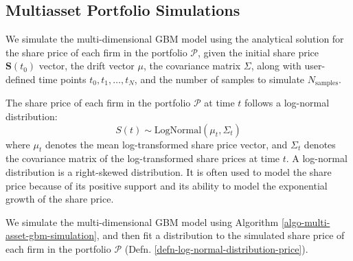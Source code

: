 \documentclass[11pt]{article}
\theoremstyle{definition}
\begin{document}
\subsection{Multiasset Portfolio Simulations}
We simulate the multi-dimensional GBM model using the analytical solution for the share price of each firm in the portfolio $\mathcal{P}$, given the initial share price $\mathbf{S}(t_{0})$ vector, the drift vector $\mu$, the covariance matrix $\Sigma$, along with user-defined time points $t_{0},t_{1},\dots,t_{N}$, and the number of samples to simulate $N_{\text{samples}}$. 

\begin{definition}\label{defn-log-normal-distribution-price}
The share price of each firm in the portfolio $\mathcal{P}$ at time $t$ follows a log-normal distribution:
\begin{equation*}
S(t)\sim\text{LogNormal}\left(\mu_{t},\Sigma_{t}\right)
\end{equation*}
where $\mu_{t}$ denotes the mean log-transformed share price vector, and $\Sigma_{t}$ denotes the covariance matrix of the log-transformed share prices at time $t$. A log-normal distribution is a right-skewed distribution. It is often used to model the share price because of its positive support and its ability to model the exponential growth of the share price.
\end{definition}
We simulate the multi-dimensional GBM model using Algorithm \ref{algo-multi-asset-gbm-simulation}, and then fit a distribution to the simulated share price of each firm in the portfolio $\mathcal{P}$ (Defn. \ref{defn-log-normal-distribution-price}).
\end{document}
